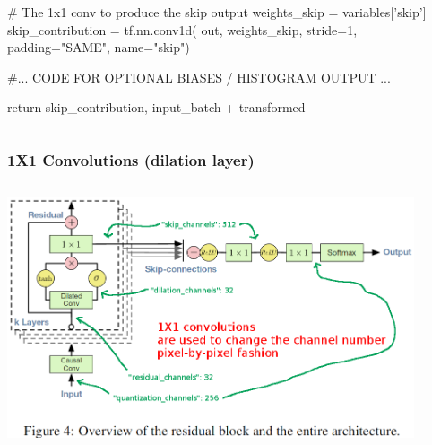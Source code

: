 \documentclass[8pt]{beamer}
\begin{document}
\begin{frame}[fragile]
\begin{columns}
\begin{column}{0.5\textwidth}
\begin{verbnobox}[\tiny]
        # The 1x1 conv to produce the skip output
        weights_skip = variables['skip']
        skip_contribution = tf.nn.conv1d(
            out, weights_skip, stride=1, padding="SAME", name="skip")

            #... CODE FOR OPTIONAL BIASES / HISTOGRAM OUTPUT ...
        
        return skip_contribution, input_batch + transformed
 \end{verbnobox}

\end{column}
\end{columns} 
 
\end{frame}

\begin{frame}[fragile]
\frametitle{1X1 Convolutions (dilation layer)}
\begin{columns}
\begin{column}{0.5\textwidth}
 
\includegraphics[width=0.9\textwidth]{./dl3_images/1x1_convolutions_1.png}


\end{column}
\end{columns}
\end{frame}
\end{document}
